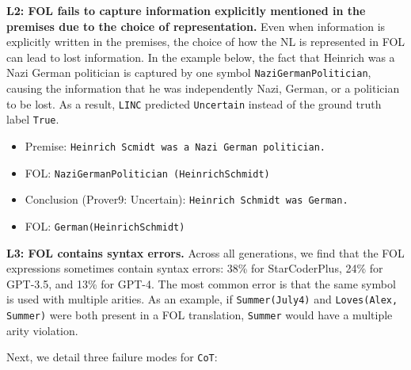\documentclass[11pt]{article}
\begin{document}
\textbf{L2: FOL fails to capture information explicitly mentioned in the premises due to the choice of representation.} Even when information is explicitly written in the premises, the choice of how the NL is represented in FOL can lead to lost information. In the example below, the fact that Heinrich was a Nazi German politician is captured by one symbol \texttt{NaziGermanPolitician}, causing the information that he was independently Nazi, German, or a politician to be lost.
As a result, \texttt{LINC} predicted \texttt{Uncertain} instead of the ground truth label \texttt{True}.

\begin{itemize}
    \item[] \small Premise: \texttt{Heinrich Scmidt was a Nazi German politician.}
    \item[] \small FOL: \texttt{NaziGermanPolitician (HeinrichSchmidt)}
    \item[] \small Conclusion (Prover9: Uncertain): \texttt{Heinrich Schmidt was German.}
    \item[] \small FOL: \texttt{German(HeinrichSchmidt)}
\end{itemize}

\textbf{L3: FOL contains syntax errors.}  Across all generations, we find that the FOL expressions sometimes contain syntax errors: 38\% for StarCoderPlus, 24\% for GPT-3.5, and 13\% for GPT-4. The most common error is that the same symbol is used with multiple arities. As an example, if \texttt{Summer(July4)} and \texttt{Loves(Alex, Summer)} were both present in a FOL translation, \texttt{Summer} would have a multiple arity violation.

Next, we detail three failure modes for \texttt{CoT}:
\end{document}
